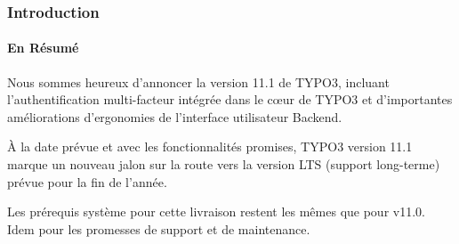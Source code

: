%

\begin{frame}[fragile]
	\frametitle{Introduction}
	\framesubtitle{En Résumé}

	\small
		Nous sommes heureux d'annoncer la version 11.1 de TYPO3, incluant l'authentification multi-facteur
		intégrée dans le cœur de TYPO3 et d'importantes améliorations d'ergonomies de l'interface utilisateur Backend.

		\vspace{0.2cm}

		À la date prévue et avec les fonctionnalités promises, TYPO3 version 11.1
		marque un nouveau jalon sur la route vers la version LTS (support long-terme)
		prévue pour la fin de l'année.

		\vspace{0.2cm}

		Les prérequis système pour cette livraison restent les mêmes que pour v11.0.
		Idem pour les promesses de support et de maintenance.

	\normalsize

\end{frame}

